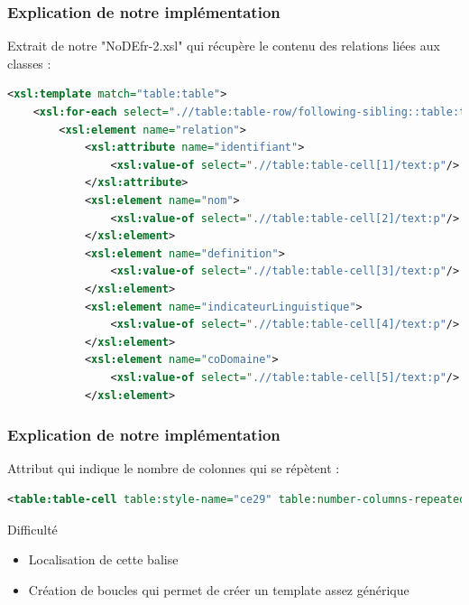 \documentclass{beamer}
\begin{document}
\begin{frame}[fragile]
\frametitle{Explication de notre implémentation}

Extrait de notre "NoDEfr-2.xsl" qui récupère le contenu des relations liées aux classes :

\vspace{0.5cm}
\begin{lstlisting}[language=XML]
<xsl:template match="table:table">
    <xsl:for-each select=".//table:table-row/following-sibling::table:table-row[1]">
        <xsl:element name="relation">
            <xsl:attribute name="identifiant">
                <xsl:value-of select=".//table:table-cell[1]/text:p"/>
            </xsl:attribute>
            <xsl:element name="nom">
                <xsl:value-of select=".//table:table-cell[2]/text:p"/>
            </xsl:element>
            <xsl:element name="definition">
                <xsl:value-of select=".//table:table-cell[3]/text:p"/>
            </xsl:element>
            <xsl:element name="indicateurLinguistique">
                <xsl:value-of select=".//table:table-cell[4]/text:p"/>
            </xsl:element>
            <xsl:element name="coDomaine">
                <xsl:value-of select=".//table:table-cell[5]/text:p"/>
            </xsl:element>
\end{lstlisting}
\end{frame}


\begin{frame}[fragile]
\frametitle{Explication de notre implémentation}

Attribut qui indique le nombre de colonnes qui se répètent :

\vspace{0.5cm}
\begin{lstlisting}[language=XML]
<table:table-cell table:style-name="ce29" table:number-columns-repeated="3"/>
\end{lstlisting}

\begin{alertblock}{Difficulté}
\begin{itemize}
    \item Localisation de cette balise
    \item Création de boucles qui permet de créer un template assez générique
\end{itemize}
\end{alertblock}


\end{frame}
\end{document}
